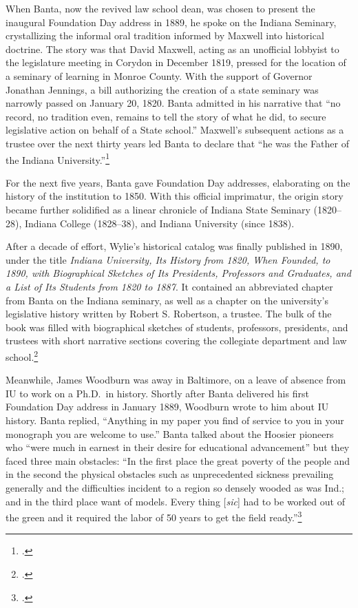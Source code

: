 \documentclass[
  american,
  letterpaper,
]{scrreprt}
\begin{document}
When Banta, now the revived law school dean, was chosen to present the
inaugural Foundation Day address in 1889, he spoke on the Indiana
Seminary, crystallizing the informal oral tradition informed by Maxwell
into historical doctrine. The story was that David Maxwell, acting as an
unofficial lobbyist to the legislature meeting in Corydon in December
1819, pressed for the location of a seminary of learning in Monroe
County. With the support of Governor Jonathan Jennings, a bill
authorizing the creation of a state seminary was narrowly passed on
January 20, 1820. Banta admitted in his narrative that ``no record, no
tradition even, remains to tell the story of what he did, to secure
legislative action on behalf of a State school.'' Maxwell's subsequent
actions as a trustee over the next thirty years led Banta to declare
that ``he was the Father of the Indiana University.''\footnote{.}

For the next five years, Banta gave Foundation Day addresses,
elaborating on the history of the institution to 1850. With this
official imprimatur, the origin story became further solidified as a
linear chronicle of Indiana State Seminary (1820--28), Indiana College
(1828--38), and Indiana University (since 1838).

After a decade of effort, Wylie's historical catalog was finally
published in 1890, under the title \emph{Indiana University, Its History
from 1820, When Founded, to 1890, with Biographical Sketches of Its
Presidents, Professors and Graduates, and a List of Its Students from
1820 to 1887}. It contained an abbreviated chapter from Banta on the
Indiana seminary, as well as a chapter on the university's legislative
history written by Robert S. Robertson, a trustee. The bulk of the book
was filled with biographical sketches of students, professors,
presidents, and trustees with short narrative sections covering the
collegiate department and law school.\footnote{.}

Meanwhile, James Woodburn was away in Baltimore, on a leave of absence
from IU to work on a Ph.D.~in history. Shortly after Banta delivered his
first Foundation Day address in January 1889, Woodburn wrote to him
about IU history. Banta replied, ``Anything in my paper you find of
service to you in your monograph you are welcome to use.'' Banta talked
about the Hoosier pioneers who ``were much in earnest in their desire
for educational advancement'' but they faced three main obstacles: ``In
the first place the great poverty of the people and in the second the
physical obstacles such as unprecedented sickness prevailing generally
and the difficulties incident to a region so densely wooded as was Ind.;
and in the third place want of models. Every thing {[}\emph{sic}{]} had
to be worked out of the green and it required the labor of 50 years to
get the field ready.''\footnote{.}
\end{document}

